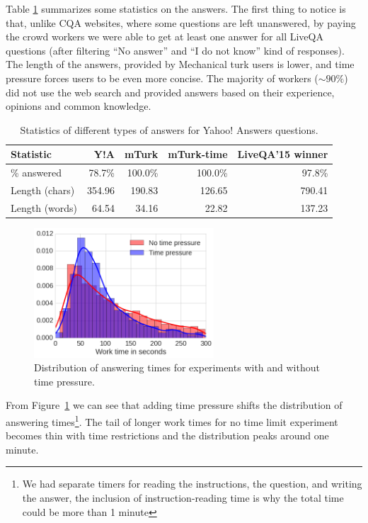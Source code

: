 Table \ref{table:non-factoid:crowdsourcing:answer_stats} summarizes some statistics on the answers.
The first thing to notice is that, unlike CQA websites, where some questions are left unanswered, by paying the crowd workers we were able to get at least one answer for all LiveQA questions (after filtering ``No answer'' and ``I do not know'' kind of responses).
The length of the answers, provided by Mechanical turk users is lower, and time pressure forces users to be even more concise.
The majority of workers ($\sim90 \%$) did not use the web search and provided answers based on their experience, opinions and common knowledge.

\begin{table}[h]
\centering
\begin{tabular}{p{3cm}|rrrr}
Statistic & Y!A & mTurk & mTurk-time & LiveQA'15 winner\\
\hline
\% answered & 78.7\% & 100.0\% & 100.0\% & 97.8\% \\
Length (chars) & 354.96 & 190.83 & 126.65 & 790.41 \\
Length (words) & 64.54 & 34.16 & 22.82 & 137.23 \\
\end{tabular}
\caption{Statistics of different types of answers for Yahoo! Answers questions.}
\label{table:non-factoid:crowdsourcing:answer_stats}
\end{table}

\begin{figure}
    \centering
    \includegraphics[width=0.6\textwidth]{img/answering_time_distribution}
    \caption{Distribution of answering times for experiments with and without time pressure.}
    \label{figure:non-factoid:crowdsourcing:answering_time_distribution}
\end{figure}

From Figure~\ref{figure:non-factoid:crowdsourcing:answering_time_distribution} we can see that adding time pressure shifts the distribution of answering times\footnote{We had separate timers for reading the instructions, the question, and writing the answer, the inclusion of instruction-reading time is why the total time could be more than 1 minute}.
The tail of longer work times for no time limit experiment becomes thin with time restrictions and the distribution peaks around one minute.

